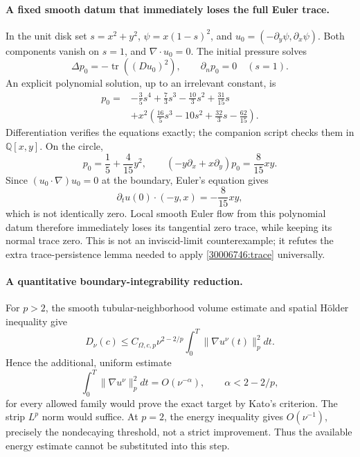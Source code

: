 \documentclass[11pt,a4paper]{article}
\newcommand{\Q}{\mathbb{Q}}
\numberwithin{equation}{section}
\begin{document}
\paragraph{A fixed smooth datum that immediately loses the full Euler trace.}
In the unit disk set $s=x^2+y^2$, $\psi=x(1-s)^2$, and
$u_0=(-\partial_y\psi,\partial_x\psi)$. Both components vanish on $s=1$,
and $\nabla\cdot u_0=0$. The initial pressure solves
\[
 \Delta p_0=-\operatorname{tr}((Du_0)^2),\qquad \partial_n p_0=0
 \quad(s=1).
\]
An explicit polynomial solution, up to an irrelevant constant, is
\begin{align*}
 p_0={}&-\frac35s^4+\frac73s^3-\frac{10}3s^2+\frac{31}{15}s\\
 &+x^2\left(\frac{16}5s^3-10s^2+\frac{32}3s-\frac{62}{15}\right).
\end{align*}
Differentiation verifies the equations exactly; the companion script checks
them in $\Q[x,y]$. On the circle,
\[
 p_0=\frac15+\frac4{15}y^2,\qquad
 (-y\partial_x+x\partial_y)p_0=\frac8{15}xy.
\]
Since $(u_0\cdot\nabla)u_0=0$ at the boundary, Euler's equation gives
\[
 \partial_tu(0)\cdot(-y,x)=-\frac8{15}xy,
\]
which is not identically zero. Local smooth Euler flow from this polynomial
datum therefore immediately loses its tangential zero trace, while keeping
its normal trace zero. This is not an inviscid-limit counterexample; it
refutes the extra trace-persistence lemma needed to apply
\eqref{30006746:trace} universally.

\paragraph{A quantitative boundary-integrability reduction.}
For $p>2$, the smooth tubular-neighborhood volume estimate and spatial
H\"older inequality give
\[
 D_\nu(c)\le C_{\Omega,c,p}\nu^{2-2/p}
                    \int_0^T\|\nabla u^\nu(t)\|_p^2dt.
\]
Hence the additional, uniform estimate
\begin{equation}\label{30006746:missing}
 \int_0^T\|\nabla u^\nu\|_p^2dt=O(\nu^{-\alpha}),
 \qquad \alpha<2-2/p,
\end{equation}
for every allowed family would prove the exact target by Kato's criterion.
The strip $L^p$ norm would suffice. At $p=2$, the energy inequality gives
$O(\nu^{-1})$, precisely the nondecaying threshold, not a strict improvement.
Thus the available energy estimate cannot be substituted into this step.
\end{document}
